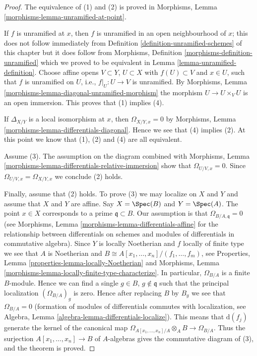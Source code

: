 \begin{proof}
The equivalence of (1) and (2) is proved in
Morphisms, Lemma \ref{morphisms-lemma-unramified-at-point}.

\medskip\noindent
If $f$ is unramified at $x$, then $f$ is unramified in an open
neighbourhood of $x$; this does not follow immediately
from Definition \ref{definition-unramified-schemes} of this chapter
but it does follow from
Morphisms, Definition \ref{morphisms-definition-unramified} which we
proved to be equivalent in
Lemma \ref{lemma-unramified-definition}.
Choose affine opens $V \subset Y$, $U \subset X$
with $f(U) \subset V$ and $x \in U$, such that $f$ is
unramified on $U$, i.e., $f|_U : U \to V$ is unramified.
By Morphisms, Lemma \ref{morphisms-lemma-diagonal-unramified-morphism}
the morphism $U \to U \times_V U$
is an open immersion. This proves that (1) implies (4).

\medskip\noindent
If $\Delta_{X/Y}$ is a local isomorphism at $x$, then
$\Omega_{X/Y, x} = 0$ by
Morphisms, Lemma \ref{morphisms-lemma-differentials-diagonal}.
Hence we see that (4) implies (2).
At this point we know that (1), (2) and (4) are all equivalent.

\medskip\noindent
Assume (3). The assumption on the diagram combined with
Morphisms, Lemma \ref{morphisms-lemma-differentials-relative-immersion}
show that $\Omega_{U/V, x} = 0$. Since $\Omega_{U/V, x} = \Omega_{X/Y, x}$
we conclude (2) holds.

\medskip\noindent
Finally, assume that (2) holds. To prove (3) we may localize on
$X$ and $Y$ and assume that $X$ and $Y$ are affine.
Say $X = \Spec(B)$ and $Y = \Spec(A)$.
The point $x \in X$ corresponds to a prime $\mathfrak q \subset B$.
Our assumption is that $\Omega_{B/A, \mathfrak q} = 0$
(see Morphisms, Lemma \ref{morphisms-lemma-differentials-affine} for the
relationship between differentials on schemes and modules
of differentials in commutative algebra).
Since $Y$ is locally Noetherian and $f$ locally of finite type
we see that $A$ is Noetherian and
$B \cong A[x_1, \ldots, x_n]/(f_1, \ldots, f_m)$, see
Properties, Lemma \ref{properties-lemma-locally-Noetherian} and
Morphisms, Lemma \ref{morphisms-lemma-locally-finite-type-characterize}.
In particular, $\Omega_{B/A}$ is a finite $B$-module. Hence we
can find a single $g \in B$, $g \not \in \mathfrak q$ such that
the principal localization $(\Omega_{B/A})_g$ is zero. Hence after
replacing $B$ by $B_g$ we see that $\Omega_{B/A} = 0$ (formation
of modules of differentials commutes with localization, see
Algebra, Lemma \ref{algebra-lemma-differentials-localize}). This means that
$\text{d}(f_j)$ generate the kernel of the canonical map
$\Omega_{A[x_1, \ldots, x_n]/A} \otimes_A B \to \Omega_{B/A}$.
Thus the surjection $A[x_1, \ldots, x_n] \to B$ of $A$-algebras gives the
commutative diagram of (3), and the theorem is proved.
\end{proof}

